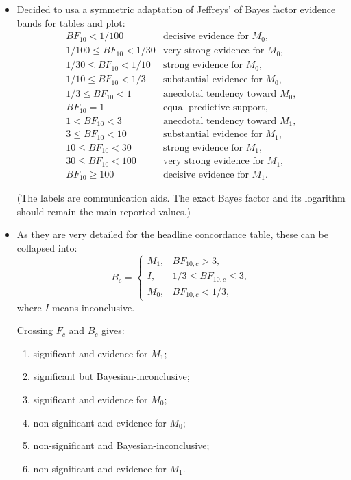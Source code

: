 \documentclass[11pt,a4paper]{article}
\begin{document}
\begin{itemize}
This is only the conventional decision rule. We should always retain the exact \(p\)-value because \(p=.049\) and \(p=.001\) should not be presented as if they are equally far from the threshold.

For descriptive plots, it may be useful to keep the bands
\[
p<.001,\qquad
.001\leq p<.01,\qquad
.01\leq p<.05,\qquad
.05\leq p<.10,\qquad
p\geq .10.
\]
These are location bands, not direct probabilities of the hypotheses. 

    \item Decided to usa a symmetric adaptation of Jeffreys' of Bayes factor evidence bands for tables and plot:
\[
\begin{array}{ll}
BF_{10}<1/100 & \text{decisive evidence for }M_0,\\
1/100\leq BF_{10}<1/30 & \text{very strong evidence for }M_0,\\
1/30\leq BF_{10}<1/10 & \text{strong evidence for }M_0,\\
1/10\leq BF_{10}<1/3 & \text{substantial evidence for }M_0,\\
1/3\leq BF_{10}<1 & \text{anecdotal tendency toward }M_0,\\
BF_{10}=1 & \text{equal predictive support},\\
1<BF_{10}<3 & \text{anecdotal tendency toward }M_1,\\
3\leq BF_{10}<10 & \text{substantial evidence for }M_1,\\
10\leq BF_{10}<30 & \text{strong evidence for }M_1,\\
30\leq BF_{10}<100 & \text{very strong evidence for }M_1,\\
BF_{10}\geq100 & \text{decisive evidence for }M_1.
\end{array}
\]

(The labels are communication aids. The exact Bayes factor and its logarithm should remain the main reported values.)

    \item As they are very detailed for the headline concordance table, these can be collapsed into:
\[
B_c =
\begin{cases}
M_1, & BF_{10,c}>3,\\
I, & 1/3\leq BF_{10,c}\leq3,\\
M_0, & BF_{10,c}<1/3,
\end{cases}
\]
where \(I\) means inconclusive.

Crossing \(F_c\) and \(B_c\) gives:
\begin{enumerate}
    \item significant and evidence for \(M_1\);
    \item significant but Bayesian-inconclusive;
    \item significant and evidence for \(M_0\);
    \item non-significant and evidence for \(M_0\);
    \item non-significant and Bayesian-inconclusive;
    \item non-significant and evidence for \(M_1\).
\end{enumerate}


\end{itemize}
\end{document}
